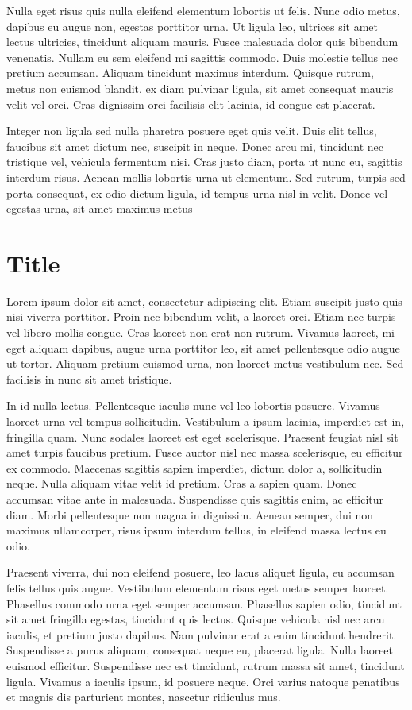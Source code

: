 \documentclass[
  a5paper,
  smalldemyvopaper,10pt,twoside,onecolumn,openright,extrafontsizes,hidelinks]{memoir}
\begin{document}
Nulla eget risus quis nulla eleifend elementum lobortis ut felis. Nunc
odio metus, dapibus eu augue non, egestas porttitor urna. Ut ligula leo,
ultrices sit amet lectus ultricies, tincidunt aliquam mauris. Fusce
malesuada dolor quis bibendum venenatis. Nullam eu sem eleifend mi
sagittis commodo. Duis molestie tellus nec pretium accumsan. Aliquam
tincidunt maximus interdum. Quisque rutrum, metus non euismod blandit,
ex diam pulvinar ligula, sit amet consequat mauris velit vel orci. Cras
dignissim orci facilisis elit lacinia, id congue est placerat.

Integer non ligula sed nulla pharetra posuere eget quis velit. Duis elit
tellus, faucibus sit amet dictum nec, suscipit in neque. Donec arcu mi,
tincidunt nec tristique vel, vehicula fermentum nisi. Cras justo diam,
porta ut nunc eu, sagittis interdum risus. Aenean mollis lobortis urna
ut elementum. Sed rutrum, turpis sed porta consequat, ex odio dictum
ligula, id tempus urna nisl in velit. Donec vel egestas urna, sit amet
maximus metus

\chapter{Title}\label{title-4}

Lorem ipsum dolor sit amet, consectetur adipiscing elit. Etiam suscipit
justo quis nisi viverra porttitor. Proin nec bibendum velit, a laoreet
orci. Etiam nec turpis vel libero mollis congue. Cras laoreet non erat
non rutrum. Vivamus laoreet, mi eget aliquam dapibus, augue urna
porttitor leo, sit amet pellentesque odio augue ut tortor. Aliquam
pretium euismod urna, non laoreet metus vestibulum nec. Sed facilisis in
nunc sit amet tristique.

In id nulla lectus. Pellentesque iaculis nunc vel leo lobortis posuere.
Vivamus laoreet urna vel tempus sollicitudin. Vestibulum a ipsum
lacinia, imperdiet est in, fringilla quam. Nunc sodales laoreet est eget
scelerisque. Praesent feugiat nisl sit amet turpis faucibus pretium.
Fusce auctor nisl nec massa scelerisque, eu efficitur ex commodo.
Maecenas sagittis sapien imperdiet, dictum dolor a, sollicitudin neque.
Nulla aliquam vitae velit id pretium. Cras a sapien quam. Donec accumsan
vitae ante in malesuada. Suspendisse quis sagittis enim, ac efficitur
diam. Morbi pellentesque non magna in dignissim. Aenean semper, dui non
maximus ullamcorper, risus ipsum interdum tellus, in eleifend massa
lectus eu odio.

Praesent viverra, dui non eleifend posuere, leo lacus aliquet ligula, eu
accumsan felis tellus quis augue. Vestibulum elementum risus eget metus
semper laoreet. Phasellus commodo urna eget semper accumsan. Phasellus
sapien odio, tincidunt sit amet fringilla egestas, tincidunt quis
lectus. Quisque vehicula nisl nec arcu iaculis, et pretium justo
dapibus. Nam pulvinar erat a enim tincidunt hendrerit. Suspendisse a
purus aliquam, consequat neque eu, placerat ligula. Nulla laoreet
euismod efficitur. Suspendisse nec est tincidunt, rutrum massa sit amet,
tincidunt ligula. Vivamus a iaculis ipsum, id posuere neque. Orci varius
natoque penatibus et magnis dis parturient montes, nascetur ridiculus
mus.
\end{document}
